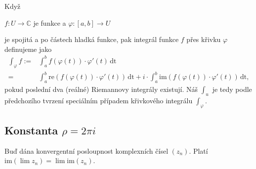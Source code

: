 \documentclass[../main.tex]{subfiles}
\begin{document}
\begin{definition}
    Když
    \begin{center}
        $f:U\to\mathbb{C}$ je funkce a $\varphi:[a,b]\to U$
    \end{center}
    je spojitá a po částech hladká funkce, pak integrál funkce $f$
    přes křivku $\varphi$ definujeme jako
    \begin{align*}
        \int_{\varphi} f :=& \int_a^b f(\varphi(t))\cdot\varphi'(t)\,\text{dt}\\
        =& \int_a^b \text{re}\left(f\left(\varphi\left(t\right)\right)\cdot\varphi'\left(t\right)\right)\,\text{dt}
        + i \cdot \int_a^b \text{im}\left(f\left(\varphi\left(t\right)\right)\cdot\varphi'\left(t\right)\right)\,\text{dt},
    \end{align*}
    pokud poslední dva (reálné) Riemannovy integrály existují. Náš  $\int_u$ je tedy podle
    předchozího tvrzení speciálním případem křivkového integrálu $\int_\varphi$.
\end{definition}

\subsection{Konstanta $\rho = 2\pi i$}

\begin{lemma}
    Buď dána konvergentní posloupnost komplexních čísel $(z_n)$. Platí $\text{im}(\lim z_n) = \lim \text{im}(z_n)$.
\end{lemma}
\end{document}
